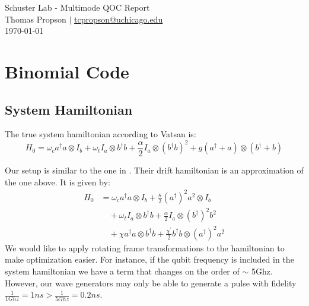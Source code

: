 \documentclass[letterpaper, 12pt]{article}
\begin{document}
\begin{center}
  {\huge Schuster Lab - Multimode QOC Report} \\[0.5em]
  {\large Thomas Propson $\vert$ \href{mailto:tcpropson@uchicago.edu}
    {tcpropson@uchicago.edu} \\[0.5em] \today}
\end{center}

\section{Binomial Code}
\subsection{System Hamiltonian}
The true system hamiltonian according to Vatsan is:
\[
H_{0} = \omega_{c} a^{\dagger} a \otimes I_{b}+ \omega_{t} I_{a} \otimes b^{\dagger} b +
\frac{\alpha}{2} I_{a} \otimes (b^{\dagger} b)^{2} + g (a^{\dagger} + a) \otimes (b^{\dagger} + b)
\]


Our setup is similar to the one in \cite{sun2014tracking}.
Their drift hamiltonian is an approximation of the one above.
It is given by:
\begin{align*}
  H_{0} &= \omega_{c}a^{\dagger}a \otimes I_{b} + \frac{\kappa}{2}(a^{\dagger})^{2}a^{2} \otimes I_{b}\\
  &\quad + \omega_{t} I_{a} \otimes b^{\dagger}b + \frac{\alpha}{2} I_{a} \otimes (b^{\dagger})^{2}b^{2} \\
  &\quad + \chi a^{\dagger}a \otimes b^{\dagger}b + \frac{\chi^{'}}{2}b^{\dagger}b \otimes (a^{\dagger})^{2}a^{2}
\end{align*}
We would like to apply rotating frame transformations to the hamiltonian to make optimization easier. For instance, if the qubit frequency is included in the system hamiltonian we have a term that changes on the order of $\sim$ 5Ghz. However, our wave generators may only be able to generate a pulse with fidelity $\frac{1}{1 Ghz} = 1 ns > \frac{1}{5 Ghz} = 0.2 ns$.
\end{document}
